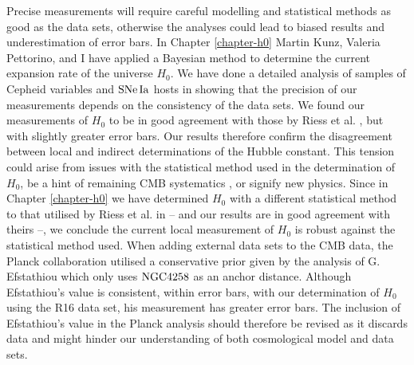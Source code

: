 Precise measurements will require careful modelling and statistical methods as good as the data sets, otherwise the analyses could lead to biased results and underestimation of error bars. In Chapter \ref{chapter-h0} Martin Kunz, Valeria Pettorino, and I have applied a Bayesian method to determine the current expansion rate of the universe $H_0$. We have done a detailed analysis of samples of Cepheid variables and $\mathrm{SNe\,Ia}$ hosts in \cite{Riess:2011yx,Riess:2016jrr} showing that the precision of our measurements depends on the consistency of the data sets. We found our measurements of $H_0$ to be in good agreement with those by Riess et al. \cite{Riess:2011yx,Riess:2016jrr}, but with slightly greater error bars. Our results therefore confirm the disagreement between local and indirect determinations of the Hubble constant. This tension could arise from issues with the statistical method used in the determination of $H_0$, be a hint of remaining CMB systematics \cite{Riess:2016jrr}, or signify new physics. Since in Chapter \ref{chapter-h0} we have determined $H_0$ with a different statistical method to that utilised by Riess et al. in \cite{Riess:2016jrr} -- and our results are in good agreement with theirs --, we conclude the current local measurement of $H_0$ is robust against the statistical method used. When adding external data sets to the CMB data, the Planck collaboration utilised a conservative prior given by the analysis of G. Efstathiou \cite{Efstathiou:2013via} which only uses $\mathrm{NGC4258}$ as an anchor distance. Although Efstathiou's value is consistent, within error bars, with our determination of $H_0$ using the R16 data set, his measurement has greater error bars. The inclusion of Efstathiou's value in the Planck analysis should therefore be revised as it discards data and might hinder our understanding of both cosmological model and data sets.        


